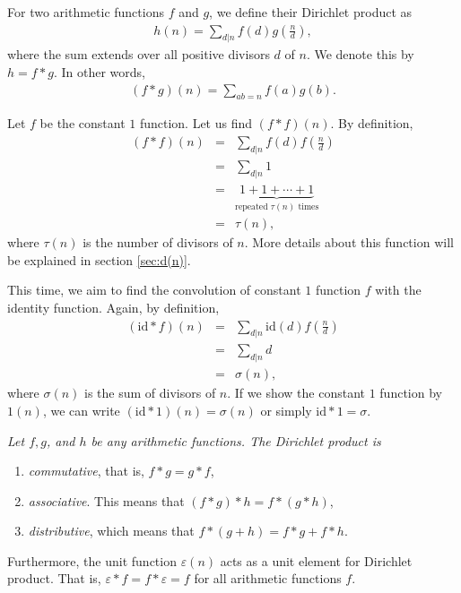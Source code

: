 \documentclass[12pt]{subfile}
\begin{document}
		\begin{definition}
			For two arithmetic functions $f$ and $g$, we define their Dirichlet product as
				\begin{align*}
					h(n)=\sum_{d|n}f(d)g\left(\frac nd\right),
				\end{align*}
			where the sum extends over all positive divisors $d$ of $n$. We denote this by $h=f\ast g$. In other words,
				\begin{align*}
					(f\ast g)(n)=\sum_{ab=n}f(a)g(b).
				\end{align*}			
		\end{definition}
		
		\begin{example}
			Let $f$ be the constant $1$ function. Let us find $(f \ast f)(n)$. By definition,
				\begin{eqnarray*}
					(f \ast f)(n) & = & \sum_{d|n}f(d)f\left(\frac nd\right)\\
								  & = & \sum_{d|n} 1\\
								  & = & \underbrace{1 + 1 + \cdots + 1}_{\text{repeated } \tau(n) \text{ times}}\\
								  & = & \tau(n),
				\end{eqnarray*}
			where $\tau(n)$ is the number of divisors of $n$. More details about this function will be explained in section \eqref{sec:d(n)}.
		\end{example}
		
		\begin{example}
			This time, we aim to find the convolution of constant $1$ function $f$ with the identity function. Again, by definition,
				\begin{eqnarray*}
					(\text{id} \ast f )(n) &=& \sum_{d|n}\text{id}(d)f\left(\frac nd\right)\\
									       &=& \sum_{d|n} d\\
										   &=& \sigma(n),
					\end{eqnarray*}
			where $\sigma(n)$ is the sum of divisors of $n$. If we show the constant $1$ function by $1(n)$, we can write $(\text{id} \ast 1)(n)=\sigma(n)$ or simply $\text{id} \ast 1 = \sigma$.
		\end{example}
		
		\begin{proposition}\slshape \label{prop:convolutionproperties}
			Let $f, g$, and $h$ be any arithmetic functions. The Dirichlet product is 
			\begin{enumerate}
				\item \textit{commutative}, that is, $f\ast g = g \ast f$,
				\item \textit{associative}. This means that $(f \ast g) \ast h = f\ast (g\ast h)$,
				\item \textit{distributive}, which means that $f\ast (g+h) = f\ast g+ f\ast h$.
			\end{enumerate}
			Furthermore, the unit function $\varepsilon(n)$ acts as a unit element for Dirichlet product. That is, $\varepsilon\ast f = f \ast \varepsilon = f$ for all arithmetic functions $f$.
		\end{proposition}
		
\end{document}
